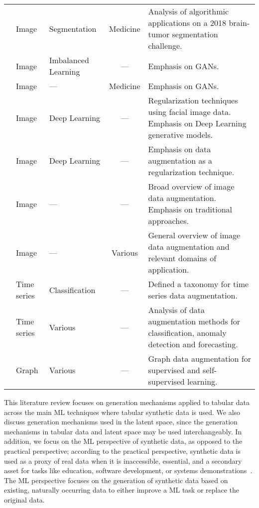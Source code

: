 \begin{table}[t!]
\begin{tabularx}{\textwidth}{@{}m{.15\linewidth}lm{.15\linewidth}cX@{}}
        \cite{nalepa2019data} & Image & Segmentation & Medicine & Analysis of
        algorithmic applications on a 2018 brain-tumor segmentation
        challenge.\\

        \cite{sampath2021survey} & Image & Imbalanced Learning &
        --- & Emphasis on GANs. \\

        \cite{yi2019generative} & Image & --- & Medicine & Emphasis on GANs.\\

        \cite{wang2020survey} & Image & Deep Learning & --- & Regularization
        techniques using facial image data. Emphasis on Deep Learning
        generative models.\\

        \cite{Shorten2019} & Image & Deep Learning & --- & Emphasis on
        data augmentation as a regularization technique.\\

        \cite{khosla2020enhancing} & Image & --- & --- & Broad overview of
        image data augmentation. Emphasis on traditional approaches. \\

        \cite{khalifa2021comprehensive} & Image & --- & Various & General
        overview of image data augmentation and relevant domains of
        application.\\

        \cite{Iwana2021} & Time series & Classification & --- &
        Defined a taxonomy for time series data augmentation.\\

        \cite{wen2020time} & Time series & Various & --- & Analysis of data
        augmentation methods for classification, anomaly detection and
        forecasting.\\

        \cite{zhao2022graph} & Graph & Various & --- & Graph data
        augmentation for supervised and self-supervised learning.\\

        \bottomrule
        
    \end{tabularx}
\end{table}
\endgroup

This literature review focuses on generation mechanisms applied to tabular
data across the main ML techniques where tabular synthetic data is used.  We
also discuss generation mechanisms used in the latent space, since the
generation mechanisms in tabular data and latent space may be used
interchangeably. In addition, we focus on the ML perspective of synthetic
data, as opposed to the practical perspective; according to the practical
perspective, synthetic data is used as a proxy of real data when it is
inaccessible, essential, and a secondary asset for tasks like education,
software development, or systems demonstrations~\cite{mannino2019real}.
The ML perspective focuses on the generation of synthetic data based on
existing, naturally occurring data to either improve a ML task or replace the
original data. 

